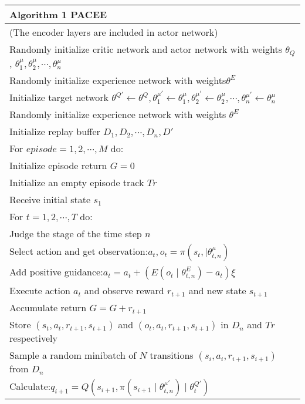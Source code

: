 \documentclass{article}
\begin{document}
\begin{table}[htbp]
  \centering
  \begin{tabular}{l}
    \hline\hline
    Algorithm 1 PACEE\\
    \hline
    (The encoder layers are included in actor network) \\
    Randomly initialize critic network and actor network with weights $\theta_{Q}$, $\theta_{1}^{\mu},\theta_{2}^{\mu},\cdots,\theta_{n}^{\mu}$\\
    Randomly initialize experience network with weights$\theta^{E}$\\
    Initialize target network $\theta^{{Q}'}\leftarrow \theta^{Q}, \theta_{1}^{{\mu}'}\leftarrow \theta_{1}^{\mu}, \theta_{2}^{{\mu}'}\leftarrow \theta_{2}^{\mu},\cdots,\theta_{n}^{{\mu}'}\leftarrow \theta_{n}^{\mu}$\\
    Randomly initialize experience network with weights $\theta^{E}$\\
    Initialize replay buffer $D_1,D_2,\cdots,D_n,{D}'$\\
    For $episode=1,2,\cdots,M$ do:\\
    \quad Initialize episode return $G=0$\\
    \quad Initialize an empty episode track $Tr$\\
    \quad Receive initial state $s_1$\\
    \quad For $t=1,2,\cdots,T$ do:\\
    \qquad Judge the stage of the time step $n$\\
    \qquad Select action and get observation:$a_t,o_t=\pi\left(s_t,\mid \theta_{t,n}^{\mu}\right)$\\
    \qquad Add positive guidance:$a_t=a_t+\left(E\left(o_t\mid\theta_{t,n}^{E}\right)-a_{t}\right)\xi$\\
    \qquad Execute action $a_{t}$ and observe reward $r_{t+1}$ and new state $s_{t+1}$ \\
    \qquad Accumulate return $G=G+r_{t+1}$  \\
    \qquad Store $(s_t,a_t,r_{t+1},s_{t+1})$ and  $(o_t,a_t,r_{t+1},s_{t+1})$ in $D_{n}$ and $Tr$ respectively \\
    \qquad Sample a random minibatch of $N$ transitions $(s_i,a_i,r_{i+1},s_{i+1})$ from $D_n$ \\
    \qquad Calculate:$q_{i+1}=Q\left(s_{i+1},\pi(s_{i+1}\mid\theta_{t,n}^{{\mu}'})\mid\theta_{t}^{{Q}'}\right)$  \\

\end{tabular}
\end{table}
\end{document}
